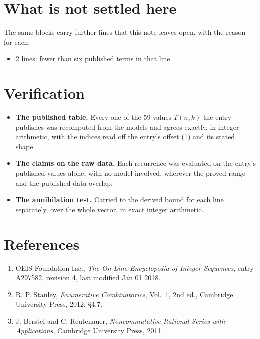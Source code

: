 \documentclass[11pt]{article}
\theoremstyle{definition}
\begin{document}
\section{What is not settled here}

The same blocks carry further lines that this note leaves open, with the reason for each:

\begin{itemize}

\item 2 lines: fewer than six published terms in that line

\end{itemize}

\section{Verification}

\begin{itemize}

\item {\bfseries The published table.} Every one of the 59 values $T(n,k)$ the entry publishes was recomputed from the models and agrees exactly, in integer arithmetic, with the indices read off the entry's offset (1) and its stated shape.

\item {\bfseries The claims on the raw data.} Each recurrence was evaluated on the entry's published values alone, with no model involved, wherever the proved range and the published data overlap.

\item {\bfseries The annihilation test.} Carried to the derived bound for each line separately, over the whole vector, in exact integer arithmetic.

\end{itemize}

\section{References}

\begin{enumerate}

\item OEIS Foundation Inc., \emph{The On-Line Encyclopedia of Integer Sequences}, entry \href{https://oeis.org/A297582}{A297582}, revision 4, last modified Jan 01 2018.

\item R. P. Stanley, \emph{Enumerative Combinatorics}, Vol.~1, 2nd ed., Cambridge University Press, 2012; \S4.7.

\item J. Berstel and C. Reutenauer, \emph{Noncommutative Rational Series with Applications}, Cambridge University Press, 2011.

\end{enumerate}
\end{document}
